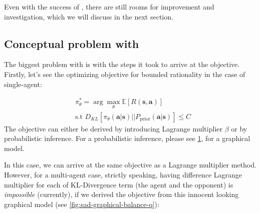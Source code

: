
Even with the success of \cite{grau2018balancing}, there are still rooms for improvement and investigation, which we will discuss in the next section.

\subsection{Conceptual problem with \cite{grau2018balancing}}

The biggest problem with \cite{grau2018balancing} is with the steps it took to arrive at the objective. Firstly, let's see the optimizing objective for bounded rationality in the case of single-agent:

\begin{equation}
    \begin{aligned}
        &\pi_{\theta}^* = \arg\max_{\theta} \mathbb{E}\left[ R(\boldsymbol{s}, \boldsymbol{a}) \right] \\
        &\text{s.t } D_{KL}\left[ \pi_{\theta}(\boldsymbol{a} | \boldsymbol{s}) \Big|\Big| P_{\text{prior}}(\boldsymbol{a} | \boldsymbol{s}) \right] \le C
    \end{aligned}
\end{equation}
The objective can either be derived by introducing Lagrange multiplier $\beta$ or by probabilistic inference. For a probabilistic inference, please see \ref{fig:one-step-single agent}, for a graphical model. 
\begin{figure}[ht]
    \begin{minipage}[t]{0.5\linewidth}
    \centering
    \end{minipage}%
    \begin{minipage}[t]{0.5\linewidth}
    \label{fig:one-step-single agent}
    \end{minipage}
\end{figure}
In this case, we can arrive at the same objective as a Lagrange multiplier method. However, for a multi-agent case, strictly speaking, having difference Lagrange multiplier for each of KL-Divergence term (the agent and the opponent) is \emph{impossible} (currently), if we derived the objective from this innocent looking graphical model (see \ref{fig:sad-graphical-balance-q}): 

